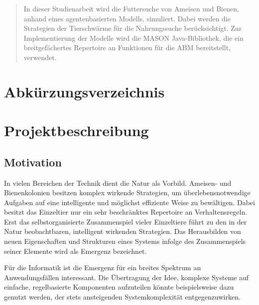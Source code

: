 \documentclass[a4paper, 11pt]{article}
\makeatletter
\newcommand*{\maintoc}{
	\begingroup
	\@fileswfalse
	\renewcommand*{\appendixattoc}{
		\value{tocdepth}=-10000
	}
	\tableofcontents
	\endgroup
}
\newcommand*{\appendixattoc}{
}
\makeatother
\begin{document}
\newpage
{}
\renewcommand{\abstractname}{Zusammenfassung}
\begin{abstract}
In dieser Studienarbeit wird die Futtersuche von Ameisen und Bienen, anhand eines agentenbasierten Modells, simuliert. Dabei werden die Strategien der Tierschwärme für die Nahrungssuche berücksichtigt. Zur Implementierung der Modelle wird die MASON Java-Bibliothek, die ein breitgefächertes Repertoire an Funktionen für die \acs{ABM} bereitstellt, verwendet. 
\end{abstract}
\newpage
\maintoc           %
\newpage
\listoffigures             %
\newpage
\listoftables              %
\newpage
\lstlistoflistings
\newpage
\section*{\Large \textbf Abkürzungsverzeichnis}  
\begin{acronym}[Bash]
\end{acronym}
\newpage
{} 
\section{Projektbeschreibung}
\subsection{Motivation}
In vielen Bereichen der Technik dient die Natur als Vorbild. Ameisen- und Bienenkolonien besitzen komplex wirkende Strategien, um überlebensnotwendige Aufgaben auf eine intelligente und möglichst effiziente Weise zu bewältigen. Dabei besitzt das Einzeltier nur ein sehr beschränktes Repertoire an Verhaltensregeln. Erst das selbstorganisierte Zusammenspiel vieler Einzeltiere führt zu den in der Natur beobachtbaren, intelligent wirkenden Strategien. Das Herausbilden von neuen Eigenschaften und Strukturen eines Systems infolge des Zusammenspiels seiner Elemente wird als Emergenz bezeichnet.
\par Für die Informatik ist die Emergenz für ein breites Spektrum an Anwendungsfällen interessant. Die Übertragung der Idee, komplexe Systeme auf einfache, regelbasierte Komponenten aufzuteilen könnte beispielsweise dazu genutzt werden, der stets ansteigenden Systemkomplexität entgegenzuwirken.
\end{document}
